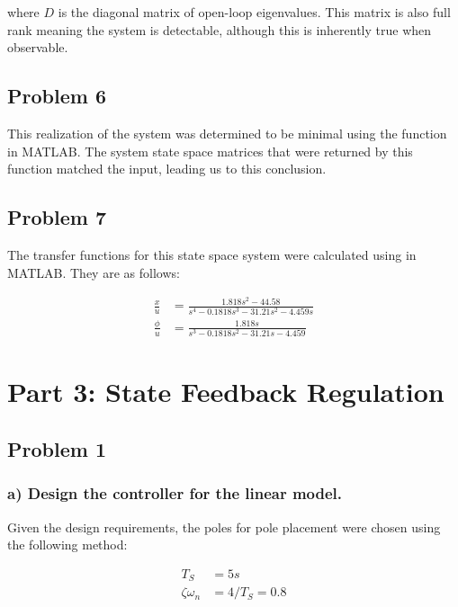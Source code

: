 \documentclass[12pt, letterpaper, onecolumn]{article}
\begin{document}
where $D$ is the diagonal matrix of open-loop eigenvalues. This matrix is also full rank meaning the system is detectable, although this is inherently true when observable.

\subsection*{Problem 6}
This realization of the system was determined to be minimal using the  function in MATLAB\@. The system state space matrices that were returned by this function matched the input, leading us to this conclusion.

\subsection*{Problem 7}
The transfer functions for this state space system were calculated using  in MATLAB\@. They are as follows:

\begin{equation*}
    \begin{split}
        \frac{x}{u} & = \frac{1.818s^2 - 44.58}{s^4 - 0.1818s^3 -31.21s^2 -4.459s} \\
        \frac{\phi}{u} & = \frac{1.818s}{s^3 - 0.1818s^2 -31.21s -4.459}
    \end{split}
\end{equation*}

\clearpage

\section*{Part 3: State Feedback Regulation}

\subsection*{Problem 1}
\subsubsection*{a) Design the controller for the linear model.}
Given the design requirements, the poles for pole placement were chosen using the following method:

\begin{equation*}
    \begin{split}
        T_S & = 5 s \\
        \zeta\omega_n & = 4/T_S = 0.8 \\
    \end{split}
\end{equation*}
\end{document}
